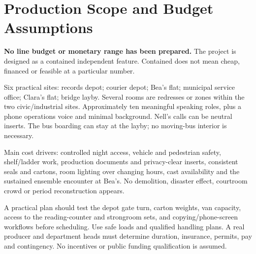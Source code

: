 \section{Production Scope and Budget Assumptions}
\textbf{No line budget or monetary range has been prepared.} The project is designed as a contained independent feature. Contained does not mean cheap, financed or feasible at a particular number.

Six practical sites: records depot; courier depot; Bea's flat; municipal service office; Clara's flat; bridge layby. Several rooms are redresses or zones within the two civic/industrial sites. Approximately ten meaningful speaking roles, plus a phone operations voice and minimal background. Nell's calls can be neutral inserts. The bus boarding can stay at the layby; no moving-bus interior is necessary.

Main cost drivers: controlled night access, vehicle and pedestrian safety, shelf/ladder work, production documents and privacy-clear inserts, consistent seals and cartons, room lighting over changing hours, cast availability and the sustained ensemble encounter at Bea's. No demolition, disaster effect, courtroom crowd or period reconstruction appears.

A practical plan should test the depot gate turn, carton weights, van capacity, access to the reading-counter and strongroom sets, and copying/phone-screen workflows before scheduling. Use safe loads and qualified handling plans. A real producer and department heads must determine duration, insurance, permits, pay and contingency. No incentives or public funding qualification is assumed.
